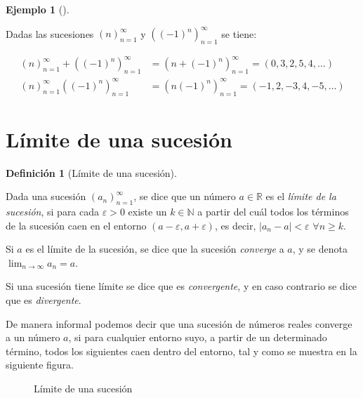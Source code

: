 \documentclass[
  a4paper,
]{scrreport}
\theoremstyle{plain}
\theoremstyle{plain}
\theoremstyle{definition}
\newtheorem{definition}{Definición}[chapter]
\theoremstyle{definition}
\newtheorem{example}{Ejemplo}[chapter]
\theoremstyle{plain}
\theoremstyle{definition}
\theoremstyle{remark}
\begin{document}
\begin{example}[]\protect\hypertarget{exm-operaciones-sucesiones}{}\label{exm-operaciones-sucesiones}

Dadas las sucesiones \((n)_{n=1}^\infty\) y \(((-1)^n)_{n=1}^\infty\) se
tiene:

\begin{align*}
(n)_{n=1}^\infty + ((-1)^n)_{n=1}^\infty &= (n + (-1)^n)_{n=1}^\infty = (0, 3, 2, 5, 4, \ldots)\\
(n)_{n=1}^\infty ((-1)^n)_{n=1}^\infty &= (n (-1)^n)_{n=1}^\infty = (-1, 2, -3, 4, -5, \ldots)
\end{align*}

\end{example}

\hypertarget{luxedmite-de-una-sucesiuxf3n}{%
\section{Límite de una sucesión}\label{luxedmite-de-una-sucesiuxf3n}}

\begin{definition}[Límite de una
sucesión]\protect\hypertarget{def-limite-sucesion}{}\label{def-limite-sucesion}

Dada una sucesión \((a_n)_{n=1}^\infty\), se dice que un número
\(a\in\mathbb{R}\) es el \emph{límite de la sucesión}, si para cada
\(\varepsilon>0\) existe un \(k\in\mathbb{N}\) a partir del cuál todos
los términos de la sucesión caen en el entorno
\((a-\varepsilon, a+\varepsilon)\), es decir, \(|a_n-a|<\varepsilon\)
\(\forall n\geq k\).

Si \(a\) es el límite de la sucesión, se dice que la sucesión
\emph{converge} a \(a\), y se denota \(\lim_{n\to\infty}a_n = a\).

\end{definition}

Si una sucesión tiene límite se dice que es \emph{convergente}, y en
caso contrario se dice que es \emph{divergente}.

De manera informal podemos decir que una sucesión de números reales
converge a un número \(a\), si para cualquier entorno suyo, a partir de
un determinado término, todos los siguientes caen dentro del entorno,
tal y como se muestra en la siguiente figura.

\begin{figure}

{\centering 



}

\caption{Límite de una sucesión}

\end{figure}
\end{document}
